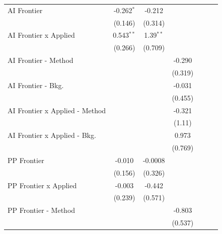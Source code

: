 \begin{tabular}{lcccccc}
   AI Frontier                    & -0.262$^{*}$  & -0.212        &               &        &        &   \\   
                                  & (0.146)       & (0.314)       &               &        &        &   \\   
   AI Frontier x Applied          & 0.543$^{**}$  & 1.39$^{**}$   &               &        &        &   \\   
                                  & (0.266)       & (0.709)       &               &        &        &   \\   
   AI Frontier - Method           &               &               & -0.290        &        &        &   \\   
                                  &               &               & (0.319)       &        &        &   \\   
   AI Frontier - Bkg.             &               &               & -0.031        &        &        &   \\   
                                  &               &               & (0.455)       &        &        &   \\   
   AI Frontier x Applied - Method &               &               & -0.321        &        &        &   \\   
                                  &               &               & (1.11)        &        &        &   \\   
   AI Frontier x Applied - Bkg.   &               &               & 0.973         &        &        &   \\   
                                  &               &               & (0.769)       &        &        &   \\   
   PP Frontier                    & -0.010        & -0.0008       &               &        &        &   \\   
                                  & (0.156)       & (0.326)       &               &        &        &   \\   
   PP Frontier x Applied          & -0.003        & -0.442        &               &        &        &   \\   
                                  & (0.239)       & (0.571)       &               &        &        &   \\   
   PP Frontier - Method           &               &               & -0.803        &        &        &   \\   
                                  &               &               & (0.537)       &        &        &   \\   

\end{tabular}
